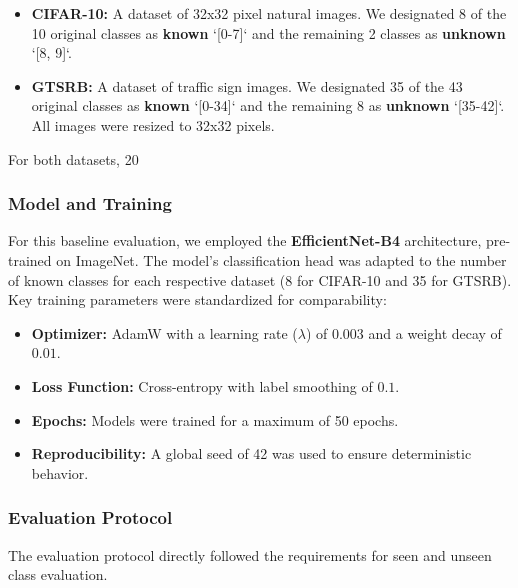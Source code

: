 \documentclass[11pt, a4paper]{article}
\begin{document}
\begin{itemize}
    \item \textbf{CIFAR-10:} A dataset of 32x32 pixel natural images. We designated 8 of the 10 original classes as \textbf{known} `[0-7]` and the remaining 2 classes as \textbf{unknown} `[8, 9]`.
    \item \textbf{GTSRB:} A dataset of traffic sign images. We designated 35 of the 43 original classes as \textbf{known} `[0-34]` and the remaining 8 as \textbf{unknown} `[35-42]`. All images were resized to 32x32 pixels.
\end{itemize}

For both datasets, 20%

\subsubsection{Model and Training}
For this baseline evaluation, we employed the \textbf{EfficientNet-B4} architecture, pre-trained on ImageNet. The model's classification head was adapted to the number of known classes for each respective dataset (8 for CIFAR-10 and 35 for GTSRB). Key training parameters were standardized for comparability:

\begin{itemize}
    \item \textbf{Optimizer:} AdamW with a learning rate ($\lambda$) of $0.003$ and a weight decay of $0.01$.
    \item \textbf{Loss Function:} Cross-entropy with label smoothing of $0.1$.
    \item \textbf{Epochs:} Models were trained for a maximum of 50 epochs.
    \item \textbf{Reproducibility:} A global seed of 42 was used to ensure deterministic behavior.
\end{itemize}

\subsubsection{Evaluation Protocol}
The evaluation protocol directly followed the requirements for seen and unseen class evaluation.
\end{document}
